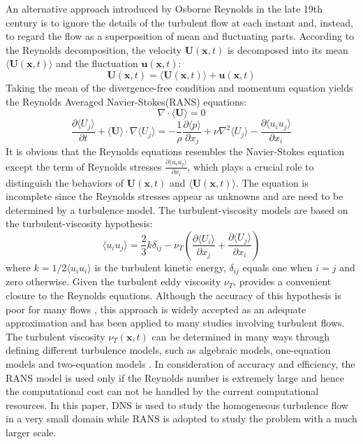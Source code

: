 An alternative approach introduced by Osborne Reynolds in the late 19th century is to ignore the details of the turbulent flow at each instant and, instead, to regard the flow as a superposition of mean and fluctuating parts. According to the Reynolds decomposition, the velocity $\mathbf{U}(\mathbf{x}, t)$ is decomposed into its mean $\langle\mathbf{U}(\mathbf{x},t)\rangle$ and the fluctuation $\mathbf{u}(\mathbf{x},t)$:
\begin{equation}
\mathbf{U}(\mathbf{x},t) = \langle\mathbf{U}(\mathbf{x},t)\rangle + \mathbf{u}(\mathbf{x},t)
\label{reynolds_decomp}
\end{equation}
Taking the mean of the divergence-free condition  and momentum equation  yields the Reynolds Averaged Navier-Stokes(RANS) equations:
\begin{equation}
\nabla\cdot\langle\mathbf{U}\rangle = 0
\label{div_free_U}
\end{equation}
\begin{equation}
\frac{\partial \langle U_j\rangle}{\partial t} + \langle \mathbf{U}\rangle
\cdot \nabla\langle U_j\rangle = 
- \frac{1}{\rho}\frac{\partial \langle p\rangle}{\partial x_j} + \nu\nabla^2\langle U_j\rangle - \frac{\partial\langle u_iu_j\rangle}{\partial x_i}
\label{reynolds_eqn}
\end{equation}
It is obvious that the Reynolds equations  resembles the Navier-Stokes equation  except the term of Reynolds stresses $\frac{\partial\langle u_iu_j\rangle}{\partial x_i}$, which plays a crucial role to distinguish the behaviors of $\mathbf{U}(\mathbf{x},t)$ and $\langle\mathbf{U}(\mathbf{x},t)\rangle$. The equation  is incomplete since the Reynolds stresses appear as unknowns and are need to be determined by a turbulence model. The turbulent-viscosity models are based on the turbulent-viscosity hypothesis: 
\begin{equation}
\langle u_iu_j\rangle = \frac{2}{3}k\delta_{ij} 
- \nu_T(\frac{\partial\langle U_i\rangle}{\partial x_j} + 
\frac{\partial\langle U_j\rangle}{\partial x_i})
\label{visc_hypo}
\end{equation}   
where $k = 1/2\langle u_iu_i\rangle$ is the turbulent kinetic energy, $\delta_{ij}$ equals one when $i = j$ and zero otherwise. Given the turbulent eddy viscosity $\nu_T$,  provides a convenient closure to the Reynolds equations. Although the accuracy of this hypothesis is poor for many flows \cite{PopeTurbulent2000}, this approach is widely accepted as an adequate approximation and has been applied to many studies involving turbulent flows. The turbulent viscosity $\nu_T(\mathbf{x},t)$ can be determined in many ways through defining different turbulence models, such as algebraic models, one-equation models and two-equation models \cite{WilcoxTurbulence2006}. In consideration of accuracy and efficiency, the RANS model is used only if the Reynolds number is extremely large and hence the computational cost can not be handled by the current computational resources. In this paper, DNS is used to study the homogeneous turbulence flow in a very small domain while RANS is adopted to study the problem with a much larger scale.   

